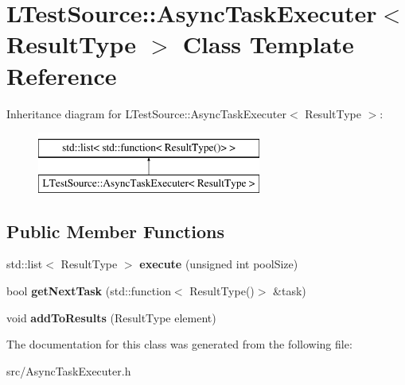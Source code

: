 \hypertarget{class_l_test_source_1_1_async_task_executer}{\section{L\-Test\-Source\-:\-:Async\-Task\-Executer$<$ Result\-Type $>$ Class Template Reference}
\label{class_l_test_source_1_1_async_task_executer}
}
Inheritance diagram for L\-Test\-Source\-:\-:Async\-Task\-Executer$<$ Result\-Type $>$\-:\begin{figure}[H]
\begin{center}
\leavevmode
\includegraphics[height=2.000000cm]{class_l_test_source_1_1_async_task_executer}
\end{center}
\end{figure}
\subsection*{Public Member Functions}
\begin{DoxyCompactItemize}
\item 
\hypertarget{class_l_test_source_1_1_async_task_executer_a23e7217f32b70dbd904bbe6a668b1621}{std\-::list$<$ Result\-Type $>$ {\bfseries execute} (unsigned int pool\-Size)}\label{class_l_test_source_1_1_async_task_executer_a23e7217f32b70dbd904bbe6a668b1621}

\item 
\hypertarget{class_l_test_source_1_1_async_task_executer_a882512265a3efe9f0ec5b273b653cc62}{bool {\bfseries get\-Next\-Task} (std\-::function$<$ Result\-Type()$>$ \&task)}\label{class_l_test_source_1_1_async_task_executer_a882512265a3efe9f0ec5b273b653cc62}

\item 
\hypertarget{class_l_test_source_1_1_async_task_executer_a68ae3931d20b2e2371e18383756345bd}{void {\bfseries add\-To\-Results} (Result\-Type element)}\label{class_l_test_source_1_1_async_task_executer_a68ae3931d20b2e2371e18383756345bd}

\end{DoxyCompactItemize}


The documentation for this class was generated from the following file\-:\begin{DoxyCompactItemize}
\item 
src/Async\-Task\-Executer.\-h\end{DoxyCompactItemize}
